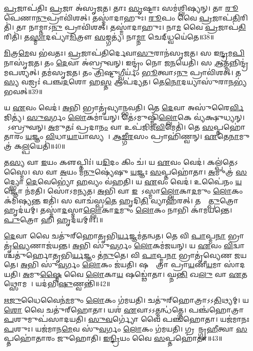 \ul{𑌪𑍍𑌰}𑌜𑌾𑌪॑𑌤𑌿𑌃 \ul{𑌪𑍍𑌰}𑌜𑌾 𑌅॑𑌸𑍃𑌜𑌤।
𑌤𑌾𑌃 \ul{𑌸𑍃}𑌷𑍍𑌟𑌾𑌃 𑌸𑌮॑𑌶𑍍𑌲𑌿𑌷𑍍𑌯𑌨𑍍।
𑌤𑌾 \ul{𑌰𑍂}𑌪𑍇𑌣𑌾\ul{𑌨𑍁}𑌪𑍍𑌰𑌾𑌵𑌿॑𑌶𑌤𑍍।
𑌤𑌸𑍍𑌮𑌾॑𑌦𑌾𑌹𑍁𑌃।
\ul{𑌰𑍂}𑌪𑌂 𑌵𑍈 \ul{𑌪𑍍𑌰}𑌜𑌾𑌪॑\ul{𑌤𑌿}𑌰𑌿𑌤𑌿॑।
𑌤𑌾 𑌨𑌾𑌮𑍍𑌨𑌾𑌽\ul{𑌨𑍁} 𑌪𑍍𑌰𑌾𑌵𑌿॑𑌶𑌤𑍍।
𑌤𑌸𑍍𑌮𑌾॑𑌦𑌾𑌹𑍁𑌃।
𑌨𑌾\ul{𑌮} 𑌵𑍈 \ul{𑌪𑍍𑌰}𑌜𑌾𑌪॑\ul{𑌤𑌿}𑌰𑌿𑌤𑌿॑।
𑌤\ul{𑌸𑍍𑌮𑌾}𑌦𑌪𑍍𑌯𑌾॑\ul{𑌮𑌿}𑌤𑍍𑌰𑍗 \ul{𑌸}𑌙𑍍𑌗𑌤𑍍𑌯॑।
𑌨𑌾\ul{𑌮𑍍𑌨𑌾} 𑌚𑍇𑌦𑍍‌𑌧𑍍𑌵𑌯𑍇॑𑌤𑍇॥38॥

\ul{𑌮𑌿}𑌤𑍍𑌰\ul{𑌮𑍇}𑌵 𑌭॑𑌵𑌤𑌃।
\ul{𑌪𑍍𑌰}𑌜𑌾𑌪॑𑌤𑌿𑌰𑍍𑌦𑍇𑌵𑌾\ul{𑌸𑍁}𑌰𑌾𑌨॑𑌸𑍃𑌜𑌤।
𑌸 𑌇\ul{𑌨𑍍𑌦𑍍𑌰}𑌮\ul{𑌪𑌿} 𑌨𑌾𑌸𑍃॑𑌜𑌤।
𑌤𑌂 \ul{𑌦𑍇}𑌵𑌾 𑌅॑𑌬𑍍𑌰𑍁𑌵𑌨𑍍।
𑌇𑌨𑍍𑌦𑍍𑌰𑌂॑ 𑌨𑍋 𑌜\ul{𑌨}𑌯𑍇𑌤𑌿॑।
𑌸 \ul{𑌆}𑌤𑍍𑌮𑌨𑍍𑌨𑌿𑌨𑍍𑌦𑍍𑌰॑𑌮𑌪𑌶𑍍𑌯𑌤𑍍।
𑌤𑌮॑𑌸𑍃𑌜𑌤।
𑌤𑌂 \ul{𑌤𑍍𑌰𑌿}𑌷𑍍𑌟𑍁\ul{𑌗𑍍𑌵𑍀}𑌰𑍍𑌯𑌂॑ \ul{𑌭𑍂}𑌤𑍍𑌵𑌾𑌽\ul{𑌨𑍁} 𑌪𑍍𑌰𑌾𑌵𑌿॑𑌶𑌤𑍍।
𑌤\ul{𑌸𑍍𑌯} 𑌵𑌜𑍍𑌰𑌃॑ 𑌪𑌞𑍍𑌚\ul{𑌦}𑌶𑍋 𑌹\ul{𑌸𑍍𑌤} 𑌆𑌪॑𑌦𑍍𑌯𑌤।
𑌤𑍇\ul{𑌨𑍋}𑌦𑌯𑍍𑌯𑌾𑌸𑍁॑𑌰𑌾\ul{𑌨}𑌭𑍍𑌯॑𑌭𑌵𑌤𑍍॥39॥

𑌯 \ul{𑌏}𑌵𑌂 𑌵𑍇𑌦॑।
\ul{𑌅}𑌭𑌿 𑌭𑍍𑌰𑌾𑌤𑍃॑𑌵𑍍𑌯𑌾𑌨𑍍𑌭𑌵𑌤𑌿।
𑌤𑍇 \ul{𑌦𑍇}𑌵𑌾 𑌅𑌸𑍁॑𑌰𑍈\ul{𑌰𑍍𑌵𑌿}𑌜𑌿𑌤𑍍𑌯॑।
\ul{𑌸𑍁}\ul{𑌵}𑌰𑍍𑌗𑌂 \ul{𑌲𑍋}𑌕𑌮𑌾॑𑌯𑌨𑍍।
𑌤𑍇॑𑌽𑌮𑍁𑌷𑍍𑌮𑌿𑌁॑\ul{𑌲𑍍𑌲𑍋}𑌕𑍇 𑌵𑍍𑌯॑𑌕𑍍𑌷𑍁𑌧𑍍𑌯𑌨𑍍।
𑌤𑍇᳚𑌽𑌬𑍍𑌰𑍁𑌵𑌨𑍍।
\ul{𑌅}𑌮𑍁𑌤𑌃॑ 𑌪𑍍𑌰𑌦𑌾\ul{𑌨𑌂} 𑌵𑌾 𑌉𑌪॑𑌜𑌿𑌜𑍀\ul{𑌵𑌿}𑌮𑍇𑌤𑌿॑।
𑌤𑍇 \ul{𑌸}𑌪𑍍𑌤𑌹𑍋॑𑌤𑌾𑌰𑌂 \ul{𑌯}𑌜𑍍𑌞𑌂 \ul{𑌵𑌿}𑌧𑌾\ul{𑌯𑌾}𑌯𑌾𑌸𑍍𑌯𑌮𑍍᳚।
\ul{𑌆}\ul{𑌙𑍍𑌗𑍀}\ul{𑌰}𑌸𑌂 𑌪𑍍𑌰𑌾𑌹𑌿॑𑌣𑍍𑌵𑌨𑍍।
\ul{𑌏}𑌤𑍇\ul{𑌨𑌾}𑌮𑍁𑌤𑍍𑌰॑ 𑌕\ul{𑌲𑍍𑌪}𑌯𑍇𑌤𑌿॑॥40॥

𑌤\ul{𑌸𑍍𑌯} 𑌵𑌾 \ul{𑌇}𑌯𑌂 𑌕𑍢𑌪𑍍𑌤𑌿𑌃॑।
𑌯\ul{𑌦𑌿}𑌦𑌂 𑌕𑌿𑌂 𑌚॑।
𑌯 \ul{𑌏}𑌵𑌂 𑌵𑍇𑌦॑।
𑌕𑌲𑍍𑌪॑𑌤𑍇\-𑌽𑌸𑍍𑌮𑍈।
𑌸 𑌵𑌾 \ul{𑌅}𑌯𑌂 𑌮॑\ul{𑌨𑍁}𑌷𑍍𑌯𑍇॑𑌷𑍁 \ul{𑌯}𑌜𑍍𑌞𑌃 \ul{𑌸}𑌪𑍍𑌤𑌹𑍋॑𑌤𑌾।
\ul{𑌅}𑌮𑍁𑌤𑍍𑌰॑ \ul{𑌸}𑌦𑍍𑌭𑍍𑌯𑍋 \ul{𑌦𑍇}𑌵𑍇𑌭𑍍𑌯𑍋॑ \ul{𑌹}𑌵𑍍𑌯𑌂 𑌵॑𑌹𑌤𑌿।
𑌯 \ul{𑌏}𑌵𑌂 𑌵𑍇𑌦॑।
𑌉𑌪𑍈॑𑌨𑌂 \ul{𑌯}𑌜𑍍𑌞𑍋 𑌨॑𑌮𑌤𑌿।
𑌸𑍋॑𑌽𑌮𑌨𑍍𑌯𑌤।
\ul{𑌅}𑌭𑌿 𑌵𑌾 \ul{𑌇}𑌮𑍇᳚\-𑌽𑌸𑍍𑌮𑌾\ul{𑌲𑍍𑌲𑍋}𑌕𑌾\ul{𑌦}𑌮𑍁𑌂 \ul{𑌲𑍋}𑌕𑌂 𑌕॑𑌮𑌿𑌷𑍍𑌯\ul{𑌨𑍍𑌤} 𑌇𑌤𑌿॑।
𑌸 𑌵𑌾𑌚॑𑌸𑍍𑌪\ul{𑌤𑍇} 𑌹𑍃𑌦𑌿\ul{𑌤𑌿} 𑌵𑍍𑌯𑌾𑌹॑𑌰𑌤𑍍।
𑌤𑌸𑍍𑌮𑌾᳚\ul{𑌤𑍍𑌪𑍁}𑌤𑍍𑌰𑍋 𑌹𑍃𑌦॑𑌯𑌮𑍍।
𑌤𑌸𑍍𑌮𑌾॑\ul{𑌦}𑌸𑍍𑌮𑌾\ul{𑌲𑍍𑌲𑍋}𑌕𑌾\ul{𑌦}𑌮𑍁𑌂 \ul{𑌲𑍋}𑌕𑌂 𑌨𑌾𑌭𑌿 𑌕𑌾॑𑌮𑌯𑌨𑍍𑌤𑍇।
\ul{𑌪𑍁}𑌤𑍍𑌰𑍋 𑌹𑌿 𑌹𑍃𑌦॑𑌯𑌮𑍍॥41॥\anuvakamend[𑌹𑍍𑌵𑌯𑍇॑𑌤𑍇 𑌅𑌭𑌵𑌤𑍍𑌕\ul{𑌲𑍍𑌪}𑌯𑍇𑌤𑍀𑌤𑌿॑ \ul{𑌚}𑌤𑍍𑌵𑌾𑌰𑌿॑ 𑌚]

\ul{𑌦𑍇}𑌵𑌾 𑌵𑍈 𑌚𑌤𑍁॑𑌰𑍍‌\mbox{}𑌹𑍋𑌤𑍃𑌭𑌿\ul{𑌰𑍍𑌯}𑌜𑍍𑌞𑌮॑𑌤𑌨𑍍𑌵𑌤।
𑌤𑍇 𑌵𑌿 \ul{𑌪𑌾}𑌪𑍍𑌮\ul{𑌨𑌾} 𑌭𑍍𑌰𑌾𑌤𑍃॑\ul{𑌵𑍍𑌯𑍇}𑌣𑌾𑌜॑𑌯𑌨𑍍𑌤।
\ul{𑌅}𑌭𑌿 𑌸𑍁॑\ul{𑌵}𑌰𑍍𑌗𑌂 \ul{𑌲𑍋}𑌕𑌮॑𑌜𑌯𑌨𑍍।
𑌯 \ul{𑌏}𑌵𑌂 \ul{𑌵𑌿}𑌦𑍍𑌵𑌾𑌶𑍍𑌚𑌤𑍁॑𑌰𑍍\mbox{}𑌹𑍋𑌤𑍃𑌭𑌿\ul{𑌰𑍍𑌯}𑌜𑍍𑌞𑌂 𑌤॑\ul{𑌨𑍁}𑌤𑍇।
𑌵𑌿 \ul{𑌪𑌾}𑌪𑍍𑌮\ul{𑌨𑌾} 𑌭𑍍𑌰𑌾𑌤𑍃॑𑌵𑍍𑌯𑍇𑌣 𑌜𑌯𑌤𑍇।
\ul{𑌅}𑌭𑌿 𑌸𑍁॑\ul{𑌵}𑌰𑍍𑌗𑌂 \ul{𑌲𑍋}𑌕𑌂 𑌜॑𑌯𑌤𑌿।
𑌷𑌡𑍍𑌢𑍋᳚𑌤𑍍𑌰𑌾 𑌪𑍍𑌰𑌾\ul{𑌯}𑌣𑍀\ul{𑌯}𑌮𑌾 𑌸𑌾॑𑌦𑌯𑌤𑌿।
\ul{𑌅}𑌮𑍁\ul{𑌷𑍍𑌮𑍈} 𑌵𑍈 \ul{𑌲𑍋}𑌕𑌾\ul{𑌯} 𑌷𑌡𑍍𑌢𑍋॑𑌤𑌾।
𑌘𑍍𑌨\ul{𑌨𑍍𑌤𑌿} 𑌖\ul{𑌲𑍁} 𑌵𑌾 \ul{𑌏}𑌤𑌥𑍍𑌸𑍋𑌮𑌮𑍍᳚।
𑌯𑌦॑𑌭𑌿\ul{𑌷𑍁}𑌣𑍍𑌵𑌨𑍍𑌤𑌿॑॥42॥

\ul{𑌋}\ul{𑌜𑍁}𑌧𑍈𑌵𑍈𑌨॑\ul{𑌮}𑌮𑍁𑌂 \ul{𑌲𑍋}𑌕𑌂 𑌗॑𑌮𑌯𑌤𑌿।
𑌚𑌤𑍁॑𑌰𑍍‌\mbox{}𑌹𑍋𑌤𑍍𑌰𑌾\-𑌽𑌽\ul{𑌤𑌿}𑌥𑍍𑌯𑌮𑍍।
𑌯\ul{𑌶𑍋} 𑌵𑍈 𑌚𑌤𑍁॑𑌰𑍍‌\mbox{}𑌹𑍋𑌤𑌾।
𑌯𑌶॑ \ul{𑌏}𑌵𑌾𑌽𑌽𑌤𑍍𑌮𑌨𑍍𑌧॑𑌤𑍍𑌤𑍇।
𑌪𑌞𑍍𑌚॑𑌹𑍋𑌤𑍍𑌰𑌾 \ul{𑌪}𑌶𑍁𑌮𑍁𑌪॑𑌸𑌾𑌦𑌯𑌤𑌿।
\ul{𑌸𑍁}\ul{𑌵}𑌰𑍍𑌗𑍍𑌯𑍋॑ 𑌵𑍈 𑌪𑌞𑍍𑌚॑𑌹𑍋𑌤𑌾।
𑌯𑌜॑𑌮𑌾𑌨𑌃 \ul{𑌪}𑌶𑍁𑌃।
𑌯𑌜॑𑌮𑌾𑌨\ul{𑌮𑍇}𑌵 𑌸𑍁॑\ul{𑌵}𑌰𑍍𑌗𑌂 \ul{𑌲𑍋}𑌕𑌂 𑌗॑𑌮𑌯𑌤𑌿।
𑌗𑍍𑌰𑌹𑌾᳚𑌨𑍍𑌗𑍃\ul{𑌹𑍀}𑌤𑍍𑌵𑌾 \ul{𑌸}𑌪𑍍𑌤𑌹𑍋॑𑌤𑌾𑌰𑌂 𑌜𑍁𑌹𑍋𑌤𑌿।
\ul{𑌇}\ul{𑌨𑍍𑌦𑍍𑌰𑌿}𑌯𑌂 𑌵𑍈 \ul{𑌸}𑌪𑍍𑌤𑌹𑍋॑𑌤𑌾॥43॥

